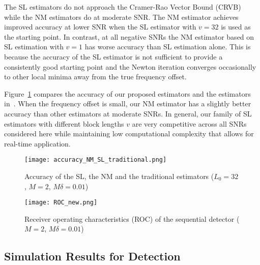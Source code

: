 The SL estimators do not approach the Cramer-Rao Vector Bound (CRVB)~\cite{Gini_98} while the NM
estimators do at moderate SNR. 
The NM estimator achieves improved accuracy at lower SNR
when the SL estimator with $v=32$ is used as the starting point. 
In contrast, at all negative SNRs the NM estimator based on SL estimation with $v=1$ has
worse accuracy than SL estimation alone.
This is because the accuracy of the SL estimator is not sufficient to
provide a consistently good starting point and the Newton iteration converges occasionally to 
other local minima away from the true frequency offset.

Figure~\ref{fig:accuracy_NM_SL_traditional} compares the accuracy of our proposed estimators
and the estimators in~\cite{kay_89,Fitz_94,Luise_Reggiannini_95}.
When the 
frequency offset is small, our NM estimator has a slightly better accuracy than other estimators at moderate SNRs.
In general, our family of  SL estimators with different block lengths $v$
are very competitive across all SNRs considered here while maintaining
low computational complexity that allows for real-time application.

\begin{figure}[t]
    \centerline{\texttt{[image: accuracy\_NM\_SL\_traditional.png]}}
    \caption{Accuracy of the SL, the NM and the traditional estimators ($L_0=32$, $M=2$, $M\delta=0.01$)}
    \label{fig:accuracy_NM_SL_traditional}
    \end{figure}

\begin{figure}[t]
  \centerline{\texttt{[image: ROC\_new.png]}}
  \caption{Receiver operating characteristics (ROC) of the sequential detector ($M=2$, $M\delta=0.01$)}
  \label{fig:Receiver operating characteristics}
\end{figure}


\subsection{Simulation Results for Detection}


